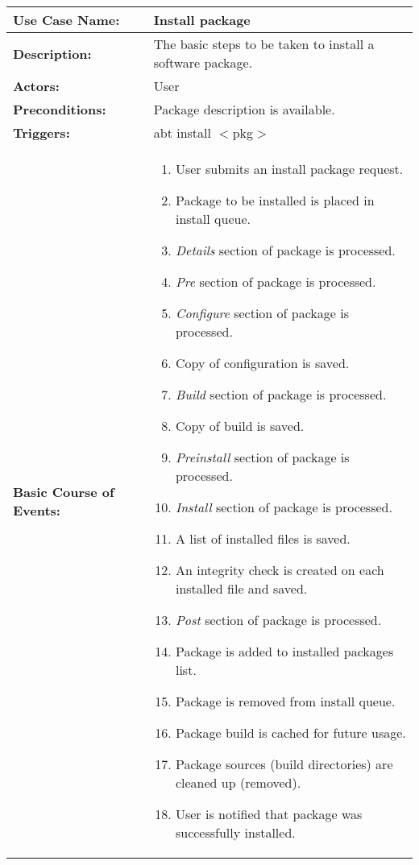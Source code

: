
\begin{tabularx}{\linewidth}{|l|X|}
\hline
\textbf{Use Case Name:} & \textbf{Install package} \\
\hline
\textbf{Description:} & 
The basic steps to be taken to install a software package. \\
\hline
\textbf{Actors:} & User \\
\hline
\textbf{Preconditions:} & Package description is available. \\
\hline
\textbf{Triggers:} & abt install $<$pkg$>$ \\
\hline
\textbf{Basic Course of Events:} & 
\begin{minipage}{\linewidth} 
  \vspace{0.05em}
  \begin{enumerate}
    \item User submits an install package request.
    \item Package to be installed is placed in install queue.
    \item \emph{Details} section of package is processed.
    \item \emph{Pre} section of package is processed.
    \item \emph{Configure} section of package is processed.
    \item Copy of configuration is saved.
    \item \emph{Build} section of package is processed.
    \item Copy of build is saved.
    \item \emph{Preinstall} section of package is processed.
    \item \emph{Install} section of package is processed.
    \item A list of installed files is saved.
    \item An integrity check is created on each installed file and saved.
    \item \emph{Post} section of package is processed.
    \item Package is added to installed packages list.
    \item Package is removed from install queue.
    \item Package build is cached for future usage.
    \item Package sources (build directories) are cleaned up (removed).
    \item User is notified that package was successfully installed.
  \end{enumerate}
  \vspace{0.05em}
\end{minipage}
\\
\hline
\end{tabularx}

